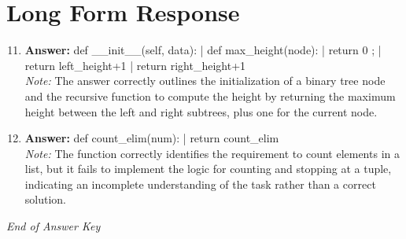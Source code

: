 \documentclass[12pt]{article}
\begin{document}
\section*{Long Form Response}
\begin{enumerate}[label=\arabic*.]
\setcounter{enumi}{10}
\item \textbf{Answer:} def \_\_init\_\_(self, data): | def max\_height(node): | return 0 ; | return left\_height+1 | return right\_height+1
\\ \textit{Note:} The answer correctly outlines the initialization of a binary tree node and the recursive function to compute the height by returning the maximum height between the left and right subtrees, plus one for the current node.
\item \textbf{Answer:} def count\_elim(num): | return count\_elim
\\ \textit{Note:} The function correctly identifies the requirement to count elements in a list, but it fails to implement the logic for counting and stopping at a tuple, indicating an incomplete understanding of the task rather than a correct solution.
\end{enumerate}

\vfill
\noindent\textit{End of Answer Key}
\end{document}
